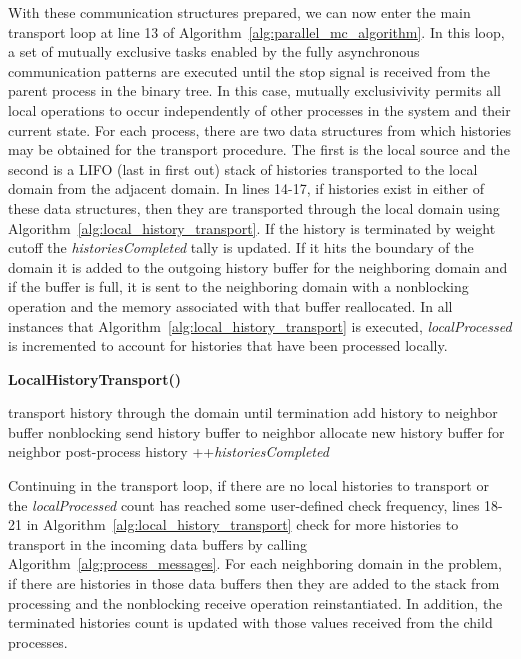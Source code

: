 With these communication structures prepared, we can now enter the
main transport loop at line 13 of
Algorithm~\ref{alg:parallel_mc_algorithm}. In this loop, a set of
mutually exclusive tasks enabled by the fully asynchronous
communication patterns are executed until the stop signal is received
from the parent process in the binary tree. In this case, mutually
exclusivivity permits all local operations to occur independently of
other processes in the system and their current state. For each
process, there are two data structures from which histories may be
obtained for the transport procedure. The first is the local source
and the second is a LIFO (last in first out) stack of histories
transported to the local domain from the adjacent domain. In lines
14-17, if histories exist in either of these data structures, then
they are transported through the local domain using
Algorithm~\ref{alg:local_history_transport}. If the history is
terminated by weight cutoff the \textit{historiesCompleted} tally is
updated. If it hits the boundary of the domain it is added to the
outgoing history buffer for the neighboring domain and if the buffer
is full, it is sent to the neighboring domain with a nonblocking
operation and the memory associated with that buffer reallocated. In
all instances that Algorithm~\ref{alg:local_history_transport} is
executed, \textit{localProcessed} is incremented to account for
histories that have been processed locally.

\begin{algorithm}[h!]
  \caption{\textbf{LocalHistoryTransport()}}
  \label{alg:local_history_transport}
  \begin{algorithmic}[1]
    \State transport history through the domain until termination
    \State add history to neighbor buffer
    \State nonblocking send history buffer to neighbor
    \State allocate new history buffer for neighbor
    \EndIf
    \Else
    \State post-process history
    \State ++\textit{historiesCompleted}
    \EndIf
    \EndIf
  \end{algorithmic}
\end{algorithm}

Continuing in the transport loop, if there are no local histories to
transport or the \textit{localProcessed} count has reached some
user-defined check frequency, lines 18-21 in
Algorithm~\ref{alg:local_history_transport} check for more histories
to transport in the incoming data buffers by calling
Algorithm~\ref{alg:process_messages}. For each neighboring domain in
the problem, if there are histories in those data buffers then they
are added to the stack from processing and the nonblocking receive
operation reinstantiated. In addition, the terminated histories count
is updated with those values received from the child processes.

